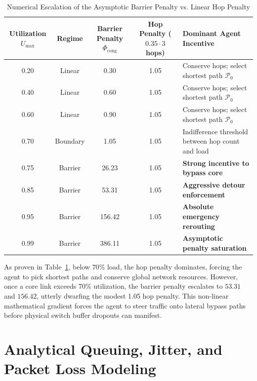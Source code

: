 \begin{table}[htbp]
\centering
\caption{Numerical Escalation of the Asymptotic Barrier Penalty vs. Linear Hop Penalty}
\label{tab:barrier_numerical_values}
\begin{tabular}{c c c c l}
\toprule
\textbf{Utilization $U_{\max}$} & \textbf{Regime} & \textbf{Barrier Penalty $\Phi_{\text{cong}}$} & \textbf{Hop Penalty ($0.35 \cdot 3$ hops)} & \textbf{Dominant Agent Incentive} \\
\midrule
0.20 & Linear & 0.30 & 1.05 & Conserve hops; select shortest path $\mathcal{P}_0$ \\
0.40 & Linear & 0.60 & 1.05 & Conserve hops; select shortest path $\mathcal{P}_0$ \\
0.60 & Linear & 0.90 & 1.05 & Conserve hops; select shortest path $\mathcal{P}_0$ \\
0.70 & Boundary & 1.05 & 1.05 & Indifference threshold between hop count and load \\
0.75 & Barrier & 26.23 & 1.05 & \textbf{Strong incentive to bypass core} \\
0.85 & Barrier & 53.31 & 1.05 & \textbf{Aggressive detour enforcement} \\
0.95 & Barrier & 156.42 & 1.05 & \textbf{Absolute emergency rerouting} \\
0.99 & Barrier & 386.11 & 1.05 & \textbf{Asymptotic penalty saturation} \\
\bottomrule
\end{tabular}
\end{table}

As proven in Table~\ref{tab:barrier_numerical_values}, below $70\%$ load, the hop penalty dominates, forcing the agent to pick shortest paths and conserve global network resources. However, once a core link exceeds $70\%$ utilization, the barrier penalty escalates to $53.31$ and $156.42$, utterly dwarfing the modest 1.05 hop penalty. This non-linear mathematical gradient forces the agent to steer traffic onto lateral bypass paths before physical switch buffer dropouts can manifest.

\section{Analytical Queuing, Jitter, and Packet Loss Modeling}

